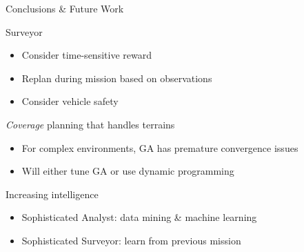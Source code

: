 \documentclass[9pt]{beamer}
\begin{document}
\begin{frame}{Conclusions \& Future Work}
    \begin{block}{Surveyor}
        \begin{itemize}
	        \item Consider time-sensitive reward
	        \item Replan during mission based on observations 
	        \item Consider vehicle safety
        \end{itemize}
    \end{block}
    \begin{block}{\textit{Coverage} planning that handles terrains}
        \begin{itemize}
	        \item For complex environments, GA has premature convergence issues
	        \item Will either tune GA or use dynamic programming
        \end{itemize}
    \end{block}
    \begin{block}{Increasing intelligence}
        \begin{itemize}
	        \item Sophisticated Analyst: data mining \& machine learning
	        \item Sophisticated Surveyor: learn from previous mission
        \end{itemize}
    \end{block}    
\end{frame}
\end{document}
